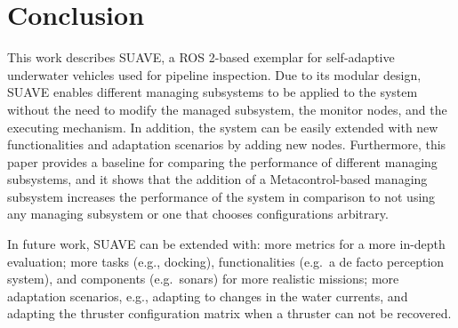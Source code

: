 \section{Conclusion}\label{sec:conclusion}

This work describes SUAVE, a ROS 2-based exemplar for self-adaptive underwater vehicles used for pipeline inspection. Due to its modular design, SUAVE enables different managing subsystems to be applied to the system without the need to modify the managed subsystem, the monitor nodes, and the executing mechanism. In addition, the system can be easily extended with new functionalities and adaptation scenarios by adding new nodes. Furthermore, this paper provides a baseline for comparing the performance of different managing subsystems, and it shows that the addition of a Metacontrol-based managing subsystem increases the performance of the system in comparison to not using any managing subsystem or one that chooses configurations arbitrary.


In future work, SUAVE can be extended with: more metrics for a more in-depth evaluation; more tasks (e.g., docking), functionalities (e.g.\ a de facto perception system), and components (e.g.\ sonars) for more realistic missions; more adaptation scenarios, e.g., adapting to changes in the water currents, and adapting the thruster configuration matrix when a thruster can not be recovered.












